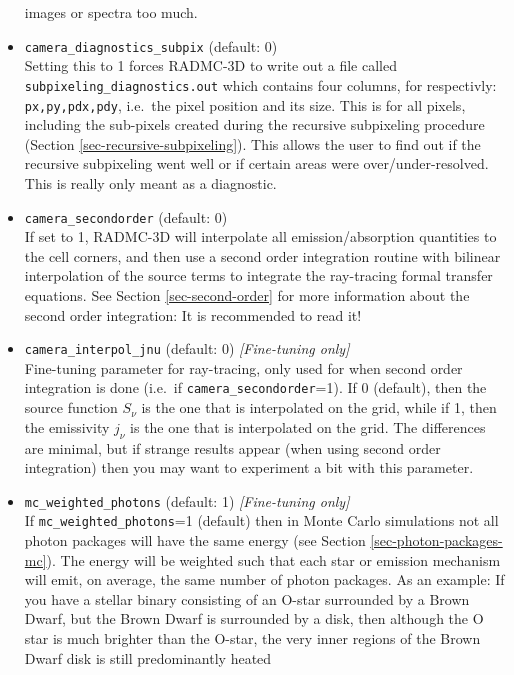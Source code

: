 \documentclass{report}
\begin{document}
\begin{itemize}
  images or spectra too much.
\item {\small\tt camera\_diagnostics\_subpix} (default: 0)\\
  Setting this to 1 forces RADMC-3D to write out a file called {\small\tt
    subpixeling\_diagnostics.out} which contains four columns, for
  respectivly: {\small\tt px,py,pdx,pdy}, i.e.\ the pixel position and its
  size. This is for all pixels, including the sub-pixels created during the
  recursive subpixeling procedure (Section
  \ref{sec-recursive-subpixeling}). This allows the user to find out if the
  recursive subpixeling went well or if certain areas were
  over/under-resolved. This is really only meant as a diagnostic.
\item {\small\tt camera\_secondorder} (default: 0)\\
  If set to 1, RADMC-3D will interpolate all emission/absorption quantities
  to the cell corners, and then use a second order integration routine with
  bilinear interpolation of the source terms to integrate the ray-tracing
  formal transfer equations. See Section \ref{sec-second-order} for more
  information about the second order integration: It is recommended to
  read it!
\item {\small\tt camera\_interpol\_jnu} (default: 0) {\em [Fine-tuning only]}\\
  Fine-tuning parameter for ray-tracing, only used for when second order
  integration is done (i.e.\ if {\small\tt camera\_secondorder}=1). If 0
  (default), then the source function $S_\nu$ is the one that is
  interpolated on the grid, while if 1, then the emissivity $j_\nu$ is the
  one that is interpolated on the grid. The differences are minimal, but
  if strange results appear (when using second order integration) then you
  may want to experiment a bit with this parameter.
\item {\small\tt mc\_weighted\_photons} (default: 1) {\em [Fine-tuning only]}\\
  If {\small\tt mc\_weighted\_photons}=1 (default) then in Monte Carlo
  simulations not all photon packages will have the same energy (see Section
  \ref{sec-photon-packages-mc}). The energy will be weighted such that each
  star or emission mechanism will emit, on average, the same number of
  photon packages. As an example: If you have a stellar binary consisting of
  an O-star surrounded by a Brown Dwarf, but the Brown Dwarf is surrounded
  by a disk, then although the O star is much brighter than the O-star, the
  very inner regions of the Brown Dwarf disk is still predominantly heated

\end{itemize}
\end{document}

